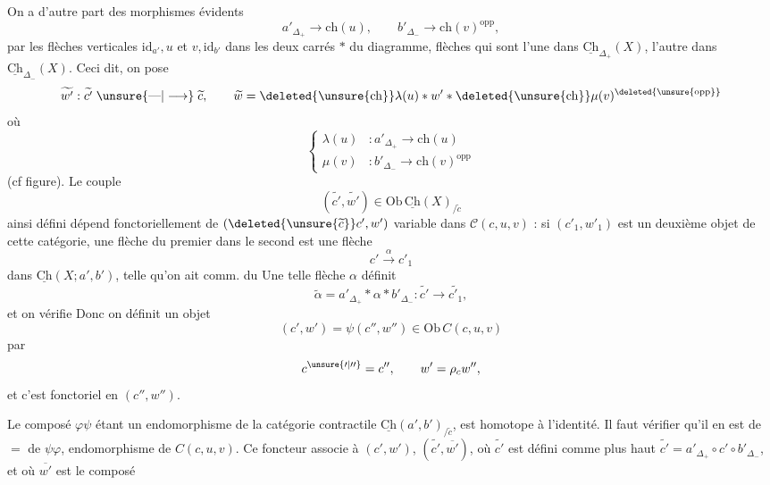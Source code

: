 On a d'autre part des morphismes évidents
\[
a'_{\Delta_+}\longrightarrow\mathrm{ch}(u),\qquad b'_{\Delta_-}\longrightarrow\mathrm{ch}(v)^{\mathrm{opp}},
\]
 par les flèches verticales $\mathrm{id}_{a'},u$ et $v,\mathrm{id}_{b'}$ dans les deux carrés  $*$ du diagramme, flèches qui sont l'une dans $\underline{\mathrm{Ch}}_{\Delta_+}(X)$, l'autre dans $\underline{\mathrm{Ch}}_{\Delta_-}(X)$. Ceci dit, on pose
\[
\widetilde{w'}:\widetilde{c'}\mathrel{\unsure{\text{---}|\longrightarrow}}\widetilde c,\qquad
\widetilde w=\deleted{\unsure{\mathrm{ch}}}\lambda(u)*w'*\deleted{\unsure{\mathrm{ch}}}\mu(v)^{\deleted{\unsure{\mathrm{opp}}}}
\]
où
\[
\left\{\begin{aligned}
\lambda(u)&:a'_{\Delta_+}\longrightarrow\mathrm{ch}(u)\\
\mu(v)&:b'_{\Delta_-}\longrightarrow\mathrm{ch}(v)^{\mathrm{opp}}
\end{aligned}\right.
\]
(cf figure). Le couple
\[
(\widetilde{c'},\widetilde{w'})\in\mathrm{Ob}\,\underline{\mathrm{Ch}}(X)_{/\widetilde c}
\]
ainsi défini dépend fonctoriellement de $(\deleted{\unsure{\widetilde c}}c',w')$ variable dans $\mathcal C(c,u,v)$ : si $(c'_1,w'_1)$ est un deuxième objet de cette catégorie, une flèche du premier dans le second est une flèche \unsure{$\alpha$}
\[
c'\xrightarrow{\alpha}c'_1
\]
dans $\underline{\mathrm{Ch}}(X;a',b')$, telle qu'on ait comm. du
Une telle flèche $\alpha$ définit
\[
\widetilde\alpha=a'_{\Delta_+}*\alpha*b'_{\Delta_-}:\widetilde{c'}\longrightarrow\widetilde{c'_1},
\]
 et on vérifie
 Donc on définit un objet 
\[
(c',w')=\psi(c'',w'')\in\mathrm{Ob}\,C(c,u,v)
\]
par
\[
c^{\unsure{\prime|\prime\prime}}=c'',\qquad w'=\rho_c w'',
\]
et c'est fonctoriel en $(c'',w'')$.

Le composé $\varphi\psi$ étant un endomorphisme de la catégorie contractile $\underline{\mathrm{Ch}}(a',b')_{/\widetilde c}$, est homotope à l'identité. Il faut vérifier qu'il en est de $=$ de $\psi\varphi$, endomorphisme de $C(c,u,v)$. Ce foncteur associe à $(c',w')$, $(\widetilde{c'},\overline{w'})$, où $\widetilde{c'}$ est défini comme plus haut $\widetilde{c'}=a'_{\Delta_+}\circ c'\circ b'_{\Delta_-}$, et où $\overline{w'}$ est le composé

